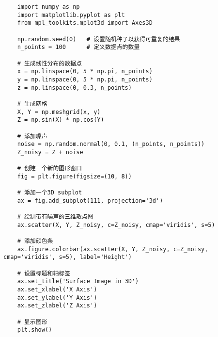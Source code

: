 \documentclass{article}
\begin{document}
\clearpage
{}
\begin{lstlisting}
	import numpy as np
	import matplotlib.pyplot as plt
	from mpl_toolkits.mplot3d import Axes3D
	
	np.random.seed(0)	# 设置随机种子以获得可重复的结果
	n_points = 100		# 定义数据点的数量
	
	# 生成线性分布的数据点
	x = np.linspace(0, 5 * np.pi, n_points)
	y = np.linspace(0, 5 * np.pi, n_points)
	z = np.linspace(0, 0.3, n_points)
	
	# 生成网格
	X, Y = np.meshgrid(x, y)
	Z = np.sin(X) * np.cos(Y)
	
	# 添加噪声
	noise = np.random.normal(0, 0.1, (n_points, n_points))
	Z_noisy = Z + noise
	
	# 创建一个新的图形窗口
	fig = plt.figure(figsize=(10, 8))
	
	# 添加一个3D subplot
	ax = fig.add_subplot(111, projection='3d')
	
	# 绘制带有噪声的三维散点图
	ax.scatter(X, Y, Z_noisy, c=Z_noisy, cmap='viridis', s=5)
	
	# 添加颜色条
	ax.figure.colorbar(ax.scatter(X, Y, Z_noisy, c=Z_noisy, cmap='viridis', s=5), label='Height')
	
	# 设置标题和轴标签
	ax.set_title('Surface Image in 3D')
	ax.set_xlabel('X Axis')
	ax.set_ylabel('Y Axis')
	ax.set_zlabel('Z Axis')
	
	# 显示图形
	plt.show()
\end{lstlisting}
	
	
\end{document}
